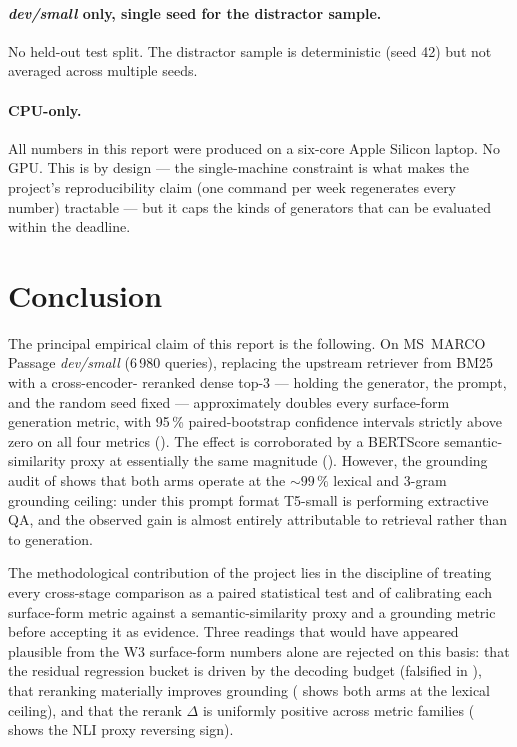 \documentclass[11pt,a4paper]{article}
\newcommand{\devsmall}{\textit{dev/small}}
\newcommand{\fdev}{6\,980}
\newcommand{\msmarco}{MS~MARCO}
\newcommand{\bertscore}{BERTScore}
\newcommand{\bmtwofive}{BM25}
\begin{document}
\paragraph{\devsmall{} only, single seed for the distractor sample.}
No held-out test split.  The distractor sample is deterministic
(seed 42) but not averaged across multiple seeds.

\paragraph{CPU-only.}  All numbers in this report were produced on
a six-core Apple Silicon laptop.  No GPU.  This is by design --- the
single-machine constraint is what makes the project's reproducibility
claim (one command per week regenerates every number) tractable ---
but it caps the kinds of generators that can be evaluated within
the deadline.

\clearpage\section{Conclusion}
\label{sec:conclusion}

The principal empirical claim of this report is the following.
On \msmarco{} Passage \devsmall{} (\fdev{} queries), replacing
the upstream retriever from \bmtwofive{} with a cross-encoder-
reranked dense top-3 --- holding the generator, the prompt, and
the random seed fixed --- approximately doubles every
surface-form generation metric, with 95\,\% paired-bootstrap
confidence intervals strictly above zero on all four metrics
().  The effect is corroborated by a
\bertscore{} semantic-similarity proxy at essentially the same
magnitude ().  However, the grounding
audit of  shows that both arms operate at the
$\sim\!99\,\%$ lexical and 3-gram grounding ceiling: under this
prompt format T5-small is performing extractive QA, and the
observed gain is almost entirely attributable to retrieval
rather than to generation.

The methodological contribution of the project lies in the
discipline of treating every cross-stage comparison as a paired
statistical test and of calibrating each surface-form metric
against a semantic-similarity proxy and a grounding metric before
accepting it as evidence.  Three readings that would have appeared
plausible from the W3 surface-form numbers alone are rejected on
this basis: that the residual regression bucket is driven by the
decoding budget (falsified in ), that
reranking materially improves grounding (
shows both arms at the lexical ceiling), and that the rerank
$\Delta$ is uniformly positive across metric families
( shows the NLI proxy reversing sign).
\end{document}
